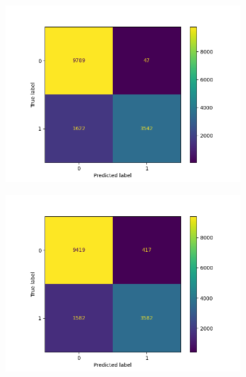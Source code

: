 \begin{figure}
\begin{subfigure}[b]{0.245\textwidth}
            \centering
            \includegraphics[scale=0.35]{"../figs/fig_content_title/fig_ngram_3_LogisticRegression(max_iter=10000, n_jobs=-1, solver='saga')__content_title.png"}
            \caption{}
        \end{subfigure}
        \begin{subfigure}[b]{0.245\textwidth}
            \centering
            \includegraphics[scale=0.35]{"../figs/fig_content_title/fig_ngramKNN_3k=1_content_title.png"}
            \subcaption{}
        \end{subfigure}
        \begin{subfigure}[b]{0.245\textwidth}  
            \centering 

\end{subfigure}
\end{figure}
